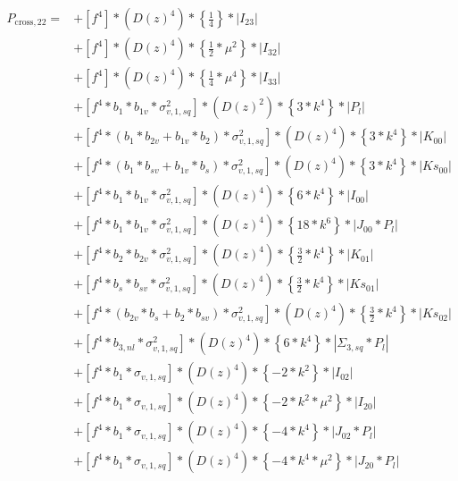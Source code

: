 \documentclass{article}
\begin{document}
\begin{equation}
\begin{aligned} 
P_{\mathrm{cross},22}=
&+\left[f^{4}\right]*\left(D(z)^{4}\right)*\left\{\frac{1}{4}\right\}*\left|I_{23}\right| \\
&+\left[f^{4}\right]*\left(D(z)^{4}\right)*\left\{\frac{1}{2}*\mu^{2}\right\}*\left|I_{32}\right| \\
&+\left[f^{4}\right]*\left(D(z)^{4}\right)*\left\{\frac{1}{4}*\mu^{4}\right\}*\left|I_{33}\right| \\
&+\left[f^{4}*b_{1}*b_{1v}*\sigma_{v,1,sq}^{2}\right]*\left(D(z)^{2}\right)*\left\{3*k^{4}\right\}*\left|P_l\right| \\
&+\left[f^{4}*(b_{1}*b_{2v} + b_{1v}*b_{2})*\sigma_{v,1,sq}^{2}\right]*\left(D(z)^{4}\right)*\left\{3*k^{4}\right\}*\left|K_{00}\right| \\
&+\left[f^{4}*(b_{1}*b_{sv} + b_{1v}*b_{s})*\sigma_{v,1,sq}^{2}\right]*\left(D(z)^{4}\right)*\left\{3*k^{4}\right\}*\left|Ks_{00}\right| \\
&+\left[f^{4}*b_{1}*b_{1v}*\sigma_{v,1,sq}^{2}\right]*\left(D(z)^{4}\right)*\left\{6*k^{4}\right\}*\left|I_{00}\right| \\
&+\left[f^{4}*b_{1}*b_{1v}*\sigma_{v,1,sq}^{2}\right]*\left(D(z)^{4}\right)*\left\{18*k^{6}\right\}*\left|J_{00}*P_l\right| \\
&+\left[f^{4}*b_{2}*b_{2v}*\sigma_{v,1,sq}^{2}\right]*\left(D(z)^{4}\right)*\left\{\frac{3}{2}*k^{4}\right\}*\left|K_{01}\right| \\
&+\left[f^{4}*b_{s}*b_{sv}*\sigma_{v,1,sq}^{2}\right]*\left(D(z)^{4}\right)*\left\{\frac{3}{2}*k^{4}\right\}*\left|Ks_{01}\right| \\
&+\left[f^{4}*(b_{2v}*b_{s} + b_{2}*b_{sv})*\sigma_{v,1,sq}^{2}\right]*\left(D(z)^{4}\right)*\left\{\frac{3}{2}*k^{4}\right\}*\left|Ks_{02}\right| \\
&+\left[f^{4}*b_{3,nl}*\sigma_{v,1,sq}^{2}\right]*\left(D(z)^{4}\right)*\left\{6*k^{4}\right\}*\left|\Sigma_{3,sq}*P_l\right| \\
&+\left[f^{4}*b_{1}*\sigma_{v,1,sq}\right]*\left(D(z)^{4}\right)*\left\{-2*k^{2}\right\}*\left|I_{02}\right| \\
&+\left[f^{4}*b_{1}*\sigma_{v,1,sq}\right]*\left(D(z)^{4}\right)*\left\{-2*k^{2}*\mu^{2}\right\}*\left|I_{20}\right| \\
&+\left[f^{4}*b_{1}*\sigma_{v,1,sq}\right]*\left(D(z)^{4}\right)*\left\{-4*k^{4}\right\}*\left|J_{02}*P_l\right| \\
&+\left[f^{4}*b_{1}*\sigma_{v,1,sq}\right]*\left(D(z)^{4}\right)*\left\{-4*k^{4}*\mu^{2}\right\}*\left|J_{20}*P_l\right| \\

\end{aligned}
\end{equation}
\end{document}
